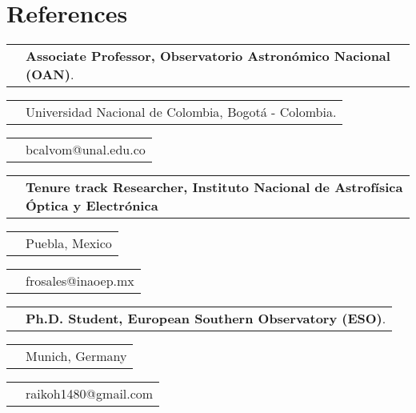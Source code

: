 \documentclass[11pt,letterpaper,sans]{moderncv}        %
\makeatletter
\renewcommand*{\cvitem}[3][.25em]{%
  \begin{tabular}{@{}p{\hintscolumnwidth}@{\hspace{\separatorcolumnwidth}}p{\maincolumnwidth}@{}}%
      \raggedleft\hintstyle{#2} &{#3}%
  \end{tabular}%
  \par\addvspace{#1}}
\makeatother
\begin{document}
\section{References}
\cvitem{\textbf{Benjam\'{i}n}}{\textbf{Associate Professor, Observatorio Astronómico Nacional (OAN)}.}
\cvitem{\textbf{Calvo-Mozo}}{Universidad Nacional de Colombia, Bogotá - Colombia.}
\cvitem{}{bcalvom@unal.edu.co}
\cvitem{\textbf{Fabi\'an }}{\textbf{Tenure track Researcher, Instituto Nacional de Astrof\'{i}sica \'{O}ptica y Electr\'onica}}
\cvitem{\textbf{Rosales}}{Puebla, Mexico}
\cvitem{\textbf{Ortega}}{frosales@inaoep.mx}
\cvitem{\textbf{Julian David}}{\textbf{Ph.D. Student, European Southern Observatory (ESO)}.}
\cvitem{\textbf{Alvarado}}{Munich, Germany}
\cvitem{\textbf{G\'omez}}{raikoh1480@gmail.com}
\nocite{*}



\end{document}

